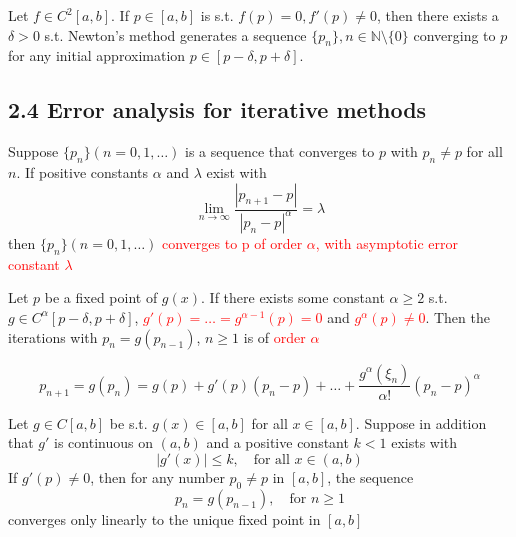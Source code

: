 \documentclass[11pt]{article}
\begin{document}
\begin{theorem}
Let $f\in C^2[a,b]$. If $p\in[a,b]$ is s.t. $f(p)=0,f'(p)\neq0$, then there
exists a $\delta>0$ s.t. Newton's method generates a sequence $\{p_n\},
n\in\mathbb{N}\setminus\{0\}$ converging to $p$ for any initial approximation
$p\in[p-\delta,p+\delta]$.
\end{theorem}
\subsection{2.4 Error analysis for iterative methods}
\label{sec:orgc84b248}
\begin{definition}
Suppose $\{p_n\}(n=0,1,\dots)$ is a sequence that converges to $p$ with
$p_n\neq p$ for all $n$. If positive constants $\alpha$ and $\lambda$ exist
with
\begin{equation*}
\lim\limits_{n\to\infty}\frac{|p_{n+1}-p|}{|p_n-p|^\alpha}=\lambda
\end{equation*}
then $\{p_n\}(n=0,1,\dots)$ \textcolor{red}{converges to p of order
$\alpha$, with asymptotic error constant $\lambda$}
\end{definition}

\begin{theorem}
Let $p$ be a fixed point of $g(x)$. If there exists some constant $\alpha\ge
2$ s.t. $g\in C^\alpha[p-\delta,p+\delta]$,
\textcolor{red}{$g'(p)=\dots=g^{\alpha-1}(p)=0$} and \textcolor{red}{$g^\alpha(p)\neq 0$}.
Then the iterations with $p_n=g(p_{n-1})$, $n\ge1$ is of \textcolor{red}{order $\alpha$}
\end{theorem}

\begin{equation*}
p_{n+1}=g(p_n)=g(p)+g'(p)(p_n-p)+\dots+\frac{g^\alpha(\xi_n)}{\alpha!}(p_n-p)^\alpha
\end{equation*}

\begin{theorem}
Let $g\in C[a,b]$ be s.t. $g(x)\in[a,b]$ for all $x\in[a,b]$. Suppose in
addition that $g'$ is continuous on $(a,b)$ and a positive constant $k<1$
exists with
\begin{equation*}
|g'(x)|\le k, \quad \text{for all } x\in(a,b)
\end{equation*}
If $g'(p)\neq0$, then for any number $p_0\neq p$ in $[a,b]$, the sequence
\begin{equation*}
p_n=g(p_{n-1}),\quad\text{for }n\ge 1
\end{equation*}
converges only linearly to the unique fixed point in $[a,b]$
\end{theorem}
\end{document}
